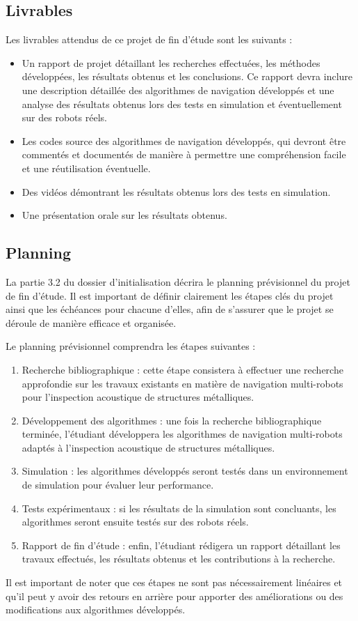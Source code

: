 \documentclass[init,francais,RandD]{rapportPFE}  %
\begin{document}
		\subsection{Livrables}
			Les livrables attendus de ce projet de fin d'étude sont les suivants :
			\begin{itemize}
				\item Un rapport de projet détaillant les recherches effectuées, les méthodes développées, les résultats obtenus et les conclusions. Ce rapport devra inclure une description détaillée des algorithmes de navigation développés et une analyse des résultats obtenus lors des tests en simulation et éventuellement sur des robots réels.
				\item Les codes source des algorithmes de navigation développés, qui devront être commentés et documentés de manière à permettre une compréhension facile et une réutilisation éventuelle.
				\item Des vidéos démontrant les résultats obtenus lors des tests en simulation.
				\item Une présentation orale sur les résultats obtenus.
			\end{itemize}



		\subsection{Planning}
			La partie 3.2 du dossier d'initialisation décrira le planning prévisionnel du projet de fin d'étude. Il est important de définir clairement les étapes clés du projet ainsi que les échéances pour chacune d'elles, afin de s'assurer que le projet se déroule de manière efficace et organisée.

			Le planning prévisionnel comprendra les étapes suivantes :
			\begin{enumerate}
				\item Recherche bibliographique : cette étape consistera à effectuer une recherche approfondie sur les travaux existants en matière de navigation multi-robots pour l'inspection acoustique de structures métalliques.
				\item Développement des algorithmes : une fois la recherche bibliographique terminée, l'étudiant développera les algorithmes de navigation multi-robots adaptés à l'inspection acoustique de structures métalliques.
				\item Simulation : les algorithmes développés seront testés dans un environnement de simulation pour évaluer leur performance.
				\item Tests expérimentaux : si les résultats de la simulation sont concluants, les algorithmes seront ensuite testés sur des robots réels.
				\item Rapport de fin d'étude : enfin, l'étudiant rédigera un rapport détaillant les travaux effectués, les résultats obtenus et les contributions à la recherche.
			\end{enumerate}
			Il est important de noter que ces étapes ne sont pas nécessairement linéaires et qu'il peut y avoir des retours en arrière pour apporter des améliorations ou des modifications aux algorithmes développés.
\end{document}
